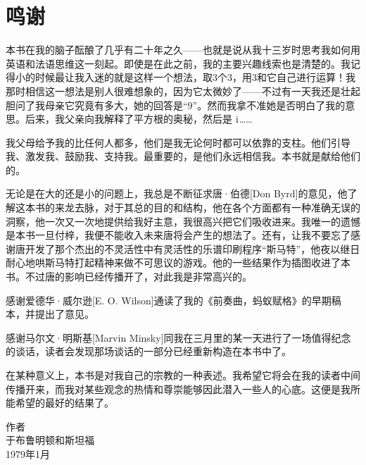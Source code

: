 
\chapter{鸣谢}

本书在我的脑子酝酿了几乎有二十年之久——也就是说从我十三岁时思考我如何用英语和法语思维这一刻起。即使是在此之前，我的主要兴趣线索也是清楚的。我记得小的时候最让我入迷的就是这样一个想法，取$3$个$3$，用$3$和它自己进行运算！我那时相信这一想法是别人很难想象的，因为它太微妙了——不过有一天我还是壮起胆问了我母亲它究竟有多大，她的回答是“$9$”。然而我拿不准她是否明白了我的意思。后来，我父亲向我解释了平方根的奥秘，然后是 $\mathrm { i }$……

我父母给予我的比任何人都多，他们是我无论何时都可以依靠的支柱。他们引导我、激发我、鼓励我、支持我。最重要的，是他们永远相信我。本书就是献给他们的。

无论是在大的还是小的问题上，我总是不断征求唐·伯德[Don Byrd]的意见，他了解这本书的来龙去脉，对于其总的目的和结构，他在各个方面都有一种准确无误的洞察，他一次又一次地提供给我好主意，我很高兴把它们吸收进来。我唯一的遗憾是本书一旦付梓，我便不能收入未来唐将会产生的想法了。还有，让我不要忘了感谢唐开发了那个杰出的不灵活性中有灵活性的乐谱印刷程序“斯马特”，他夜以继日耐心地哄斯马特打起精神来做不可思议的游戏。他的一些结果作为插图收进了本书。不过唐的影响已经传播开了，对此我是非常高兴的。

感谢爱德华·威尔逊[E. O. Wilson]通读了我的《前奏曲，蚂蚁赋格》的早期稿本，并提出了意见。

感谢马尔文·明斯基[Marvin Minsky]同我在三月里的某一天进行了一场值得纪念的谈话，读者会发现那场谈话的一部分已经重新构造在本书中了。

在某种意义上，本书是对我自己的宗教的一种表述。我希望它将会在我的读者中间传播开来，而我对某些观念的热情和尊崇能够因此潜入一些人的心底。这便是我所能希望的最好的结果了。

\begin{signature}
作者\\
于布鲁明顿和斯坦福\\
\small 1979年1月\\
\end{signature}

